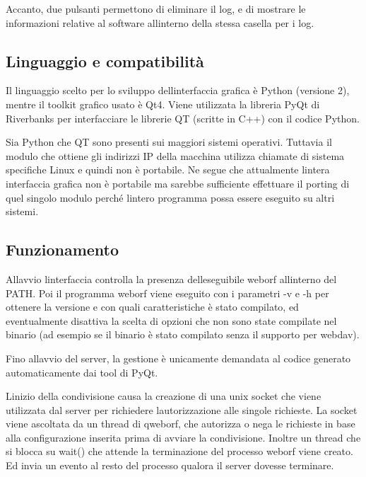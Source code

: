 \documentclass[a4paper,11pt]{article}
\begin{document}
{\sffamily
Accanto, due pulsanti permettono di eliminare il log, e di mostrare le
informazioni relative al software all{\textquotesingle}interno della
stessa casella per i log.}


\bigskip

\subsection{Linguaggio e compatibilit\`a}
{\sffamily
Il linguaggio scelto per lo sviluppo dell{\textquotesingle}interfaccia
grafica \`e Python (versione 2), mentre il toolkit grafico usato \`e
Qt4. Viene utilizzata la libreria PyQt di Riverbanks per interfacciare
le librerie QT (scritte in C++) con il codice Python.}

{\sffamily
Sia Python che QT sono presenti sui maggiori sistemi operativi. Tuttavia
il modulo che ottiene gli indirizzi IP della macchina utilizza chiamate
di sistema specifiche Linux e quindi non \`e portabile. Ne segue che
attualmente l{\textquotesingle}intera interfaccia grafica non \`e
portabile ma sarebbe sufficiente effettuare il porting di quel singolo
modulo perch\'e l{\textquotesingle}intero programma possa essere
eseguito su altri sistemi.}


\bigskip

\subsection{Funzionamento}
{\sffamily
All{\textquotesingle}avvio l{\textquotesingle}interfaccia controlla la
presenza dell{\textquotesingle}eseguibile weborf
all{\textquotesingle}interno del PATH. Poi il programma weborf viene
eseguito con i parametri -v e -h per ottenere la versione e con quali
caratteristiche \`e stato compilato, ed eventualmente disattiva la
scelta di opzioni che non sono state compilate nel binario (ad esempio
se il binario \`e stato compilato senza il supporto per webdav).}

{\sffamily
Fino all{\textquotesingle}avvio del server, la gestione \`e unicamente
demandata al codice generato automaticamente dai tool di PyQt.}

{\sffamily
L{\textquotesingle}inizio della condivisione causa la creazione di una
unix socket che viene utilizzata dal server per richiedere
l{\textquotesingle}autorizzazione alle singole richieste. La socket
viene ascoltata da un thread di qweborf, che autorizza o nega le
richieste in base alla configurazione inserita prima di avviare la
condivisione. Inoltre un thread che si blocca su wait() che attende la
terminazione del processo weborf viene creato. Ed invia un evento al
resto del processo qualora il server dovesse terminare.}
\end{document}
